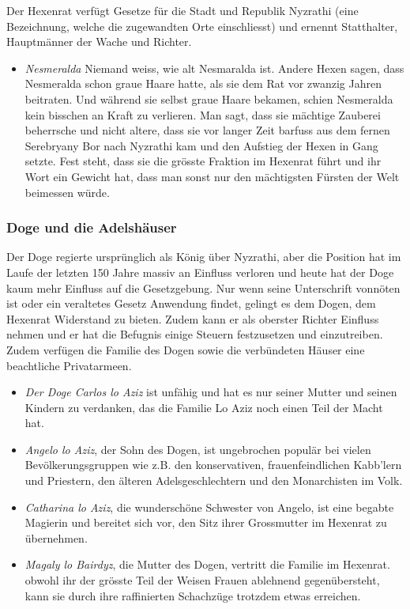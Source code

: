 \documentclass[12pt,twoside,twocolumn,openany]{book}
\begin{document}
Der Hexenrat verfügt Gesetze für die Stadt und Republik Nyzrathi (eine Bezeichnung, welche die zugewandten Orte einschliesst) und ernennt Statthalter, Hauptmänner der Wache und Richter.
\begin{itemize}
	\item\textit{Nesmeralda} Niemand weiss, wie alt Nesmaralda ist. Andere Hexen sagen, dass Nesmeralda schon graue Haare hatte, als sie dem Rat vor zwanzig Jahren beitraten. Und während sie selbst graue Haare bekamen, schien Nesmeralda kein bisschen an Kraft zu verlieren. Man sagt, dass sie mächtige Zauberei beherrsche und nicht altere, dass sie vor langer Zeit barfuss aus dem fernen Serebryany Bor nach Nyzrathi kam und den Aufstieg der Hexen in Gang setzte. Fest steht, dass sie die grösste Fraktion im Hexenrat führt und ihr Wort ein Gewicht hat, dass man sonst nur den mächtigsten Fürsten der Welt beimessen würde.
\end{itemize}

\subsubsection{Doge und die Adelshäuser} Der Doge regierte ursprünglich als König über Nyzrathi, aber die Position hat im Laufe der letzten 150 Jahre massiv an Einfluss verloren und heute hat der Doge kaum mehr Einfluss auf die Gesetzgebung. Nur wenn seine Unterschrift vonnöten ist oder ein veraltetes Gesetz Anwendung findet, gelingt es dem Dogen, dem Hexenrat Widerstand zu bieten. Zudem kann er als oberster Richter Einfluss nehmen und er hat die Befugnis einige Steuern festzusetzen und einzutreiben. Zudem verfügen die Familie des Dogen sowie die verbündeten Häuser eine beachtliche Privatarmeen.

\begin{itemize}
	\item\textit{Der Doge Carlos lo Aziz} ist unfähig und hat es nur seiner Mutter und seinen Kindern zu verdanken, das die Familie Lo Aziz noch einen Teil der Macht hat.
	\item\textit{Angelo lo Aziz}, der Sohn des Dogen, ist ungebrochen populär bei vielen Bevölkerungsgruppen wie z.B. den konservativen, frauenfeindlichen Kabb'lern und Priestern, den älteren Adelsgeschlechtern und den Monarchisten im Volk.
	\item\textit{Catharina lo Aziz}, die wunderschöne Schwester von Angelo, ist eine begabte Magierin und bereitet sich vor, den Sitz ihrer Grossmutter im Hexenrat zu übernehmen.
	\item\textit{Magaly lo Bairdyz},  die Mutter des Dogen,  vertritt die Familie im Hexenrat. obwohl ihr der grösste Teil der Weisen Frauen ablehnend gegenübersteht, kann sie durch ihre raffinierten Schachzüge trotzdem etwas erreichen.
\end{itemize}
\end{document}
